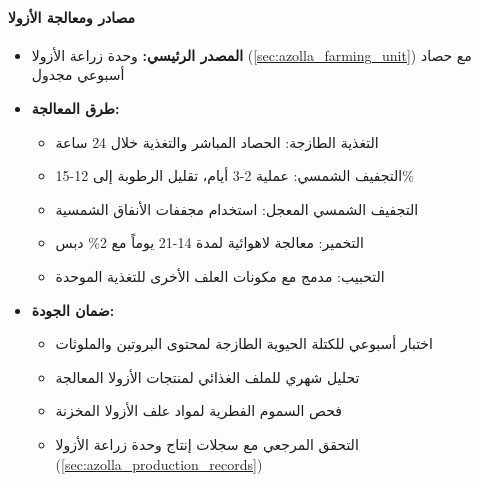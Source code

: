 \paragraph{مصادر ومعالجة الأزولا}
\begin{itemize}
    \item \textbf{المصدر الرئيسي:} وحدة زراعة الأزولا (\ref{sec:azolla_farming_unit}) مع حصاد أسبوعي مجدول
    \item \textbf{طرق المعالجة:}
    \begin{itemize}
        \item التغذية الطازجة: الحصاد المباشر والتغذية خلال 24 ساعة
        \item التجفيف الشمسي: عملية 2-3 أيام، تقليل الرطوبة إلى 12-15\%
        \item التجفيف الشمسي المعجل: استخدام مجففات الأنفاق الشمسية
        \item التخمير: معالجة لاهوائية لمدة 14-21 يوماً مع 2\% دبس
        \item التحبيب: مدمج مع مكونات العلف الأخرى للتغذية الموحدة
    \end{itemize}
    \item \textbf{ضمان الجودة:}
    \begin{itemize}
        \item اختبار أسبوعي للكتلة الحيوية الطازجة لمحتوى البروتين والملوثات
        \item تحليل شهري للملف الغذائي لمنتجات الأزولا المعالجة
        \item فحص السموم الفطرية لمواد علف الأزولا المخزنة
        \item التحقق المرجعي مع سجلات إنتاج وحدة زراعة الأزولا (\ref{sec:azolla_production_records})
    \end{itemize}
\end{itemize}

